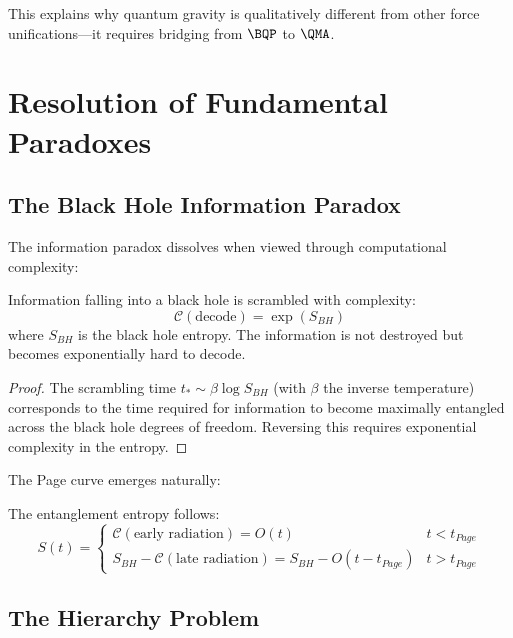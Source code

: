 \documentclass[12pt,a4paper]{article}
\newcommand{\comp}[1]{\mathcal{C}(#1)}
\begin{document}
This explains why quantum gravity is qualitatively different from other force unifications—it requires bridging from $\BQP$ to $\QMA$.

\section{Resolution of Fundamental Paradoxes}

\subsection{The Black Hole Information Paradox}

The information paradox dissolves when viewed through computational complexity:

\begin{theorem}
Information falling into a black hole is scrambled with complexity:
\begin{equation}
\comp{\text{decode}} = \exp(S_{BH})
\end{equation}
where $S_{BH}$ is the black hole entropy. The information is not destroyed but becomes exponentially hard to decode.
\end{theorem}

\begin{proof}
The scrambling time $t_* \sim \beta \log S_{BH}$ (with $\beta$ the inverse temperature) corresponds to the time required for information to become maximally entangled across the black hole degrees of freedom. Reversing this requires exponential complexity in the entropy.
\end{proof}

The Page curve emerges naturally:

\begin{proposition}
The entanglement entropy follows:
\begin{equation}
S(t) = \begin{cases}
\comp{\text{early radiation}} = O(t) & t < t_{Page} \\
S_{BH} - \comp{\text{late radiation}} = S_{BH} - O(t - t_{Page}) & t > t_{Page}
\end{cases}
\end{equation}
\end{proposition}

\subsection{The Hierarchy Problem}
\end{document}
